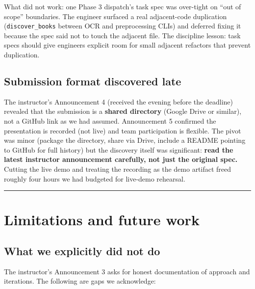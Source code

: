 \documentclass[
  letterpaper,
  DIV=11,
  numbers=noendperiod]{scrartcl}
\begin{document}
What did not work: one Phase 3 dispatch's task spec was over-tight on
``out of scope'' boundaries. The engineer surfaced a real adjacent-code
duplication (\texttt{discover\_books} between OCR and preprocessing
CLIs) and deferred fixing it because the spec said not to touch the
adjacent file. The discipline lesson: task specs should give engineers
explicit room for small adjacent refactors that prevent duplication.

\subsection{Submission format discovered
late}\label{submission-format-discovered-late}

The instructor's Announcement 4 (received the evening before the
deadline) revealed that the submission is a \textbf{shared directory}
(Google Drive or similar), not a GitHub link as we had assumed.
Announcement 5 confirmed the presentation is recorded (not live) and
team participation is flexible. The pivot was minor (package the
directory, share via Drive, include a README pointing to GitHub for full
history) but the discovery itself was significant: \textbf{read the
latest instructor announcement carefully, not just the original spec.}
Cutting the live demo and treating the recording as the demo artifact
freed roughly four hours we had budgeted for live-demo rehearsal.

\begin{center}\rule{0.5\linewidth}{0.5pt}\end{center}

\section{Limitations and future work}\label{limitations-and-future-work}

\subsection{What we explicitly did not
do}\label{what-we-explicitly-did-not-do}

The instructor's Announcement 3 asks for honest documentation of
approach and iterations. The following are gaps we acknowledge:
\end{document}

